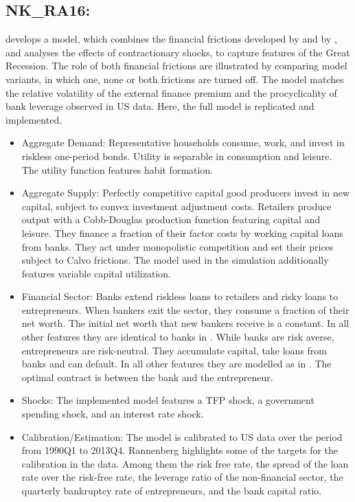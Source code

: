 \documentclass[11pt,a4paper]{article}
\begin{document}
	\subsection{NK\_RA16: \texorpdfstring{\cite{rannenberg2016bank}}{Rannenberg (2016)}}
	\label{NKRA16}
	\cite{rannenberg2016bank} develops a model, which combines the financial frictions developed by \cite{BernankeGertlerGilchrist1999} and by \cite{GertlerKaradi2011}, and analyses the effects of contractionary shocks, to capture features of the Great Recession. The role of both financial frictions are illustrated by comparing model variants, in which one, none or both frictions are turned off. The model matches the relative volatility of the external finance premium and the procyclicality of bank leverage observed in US data. Here, the full model is replicated and implemented.
	\begin{itemize}
		\item Aggregate Demand: Representative households consume, work, and invest in riskless one-period bonds. Utility is separable in consumption and leisure. The utility function features habit formation.
		
		\item Aggregate Supply: Perfectly competitive capital good producers invest in new capital, subject to convex investment adjustment costs.  Retailers produce output with a Cobb-Douglas production function featuring capital and leisure. They finance a fraction of their factor costs by working capital loans from banks. They act under monopolistic competition and set their prices subject to Calvo frictions. The model used in the simulation additionally features variable capital utilization. 
		
		\item Financial Sector: Banks extend riskless loans to retailers and risky loans to entrepreneurs. When bankers exit the sector, they consume a fraction of their net worth. The initial net worth that new bankers receive is a constant. In all other features they are identical to banks in \cite{GertlerKaradi2011}. While banks are risk averse, entrepreneurs are risk-neutral. They accumulate capital, take loans from banks and can default. In all other features they are modelled as in \cite{BernankeGertlerGilchrist1999}. The optimal contract is between the bank and the entrepreneur. 
		
		\item Shocks: The implemented model features a TFP shock, a government spending shock, and an interest rate shock. 
		
		\item Calibration/Estimation: The model is calibrated to US data over the period from 1990Q1 to 2013Q4. Rannenberg highlights some of the targets for the calibration in the data. Among them the risk free rate, the spread of the loan rate over the risk-free rate, the leverage ratio of the non-financial sector, the quarterly bankruptcy rate of entrepreneurs, and the bank capital ratio.
		
		
	\end{itemize}
	
\end{document}

